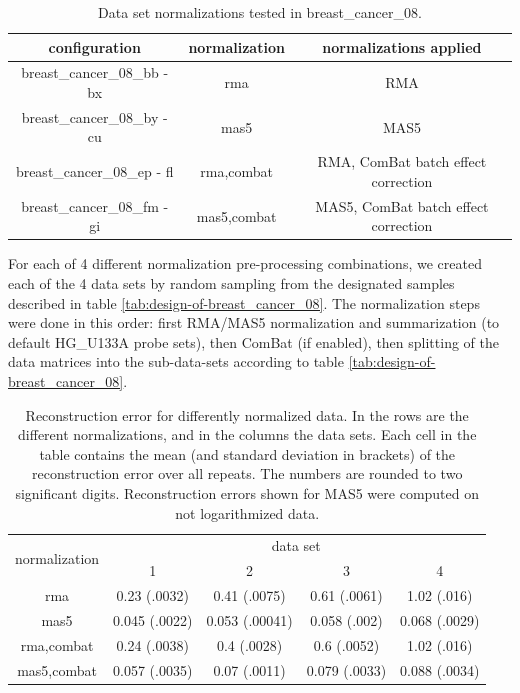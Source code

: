 \begin{table}
\begin{centering}
\begin{tabular}{|c|c|c|}
\hline 
configuration & normalization & normalizations applied\tabularnewline
\hline 
\hline 
breast\_cancer\_08\_bb - bx & rma & RMA\tabularnewline
\hline 
breast\_cancer\_08\_by - cu & mas5 & MAS5\tabularnewline
\hline 
breast\_cancer\_08\_ep - fl & rma,combat & RMA, ComBat batch effect correction\tabularnewline
\hline 
breast\_cancer\_08\_fm - gi & mas5,combat & MAS5, ComBat batch effect correction\tabularnewline
\hline 
\end{tabular}
\par\end{centering}
\caption{\label{tab:normalizations-for-breast_cancer_08}Data set normalizations
tested in breast\_cancer\_08.}
\end{table}

For each of 4 different normalization pre-processing combinations,
we created each of the 4 data sets by random sampling from the designated
samples described in table \ref{tab:design-of-breast_cancer_08}.
The normalization steps were done in this order: first RMA/MAS5 normalization
and summarization (to default HG\_U133A probe sets), then ComBat (if
enabled), then splitting of the data matrices into the sub-data-sets
according to table \ref{tab:design-of-breast_cancer_08}.

\begin{table}
\begin{centering}
\begin{tabular}{|c||c|c|c|c|}
\hline 
\multirow{2}{*}{normalization} & \multicolumn{4}{c|}{data set}\tabularnewline
\cline{2-5} 
 & 1 & 2 & 3 & 4\tabularnewline
\hline 
\hline 
rma & 0.23 (.0032) & 0.41 (.0075) & 0.61 (.0061) & 1.02 (.016)\tabularnewline
\hline 
mas5 & 0.045 (.0022) & 0.053 (.00041) & 0.058 (.002) & 0.068 (.0029)\tabularnewline
\hline 
rma,combat & 0.24 (.0038) & 0.4 (.0028) & 0.6 (.0052) & 1.02 (.016)\tabularnewline
\hline 
mas5,combat & 0.057 (.0035) & 0.07 (.0011) & 0.079 (.0033) & 0.088 (.0034)\tabularnewline
\hline 
\end{tabular}
\par\end{centering}
\caption[Reconstruction error for differently normalized data.]{\label{tab:Reconstruction-error-for-breast_cancer_08}Reconstruction
error for differently normalized data. In the rows are the different
normalizations, and in the columns the data sets. Each cell in the
table contains the mean (and standard deviation in brackets) of the
reconstruction error over all repeats. The numbers are rounded to
two significant digits. Reconstruction errors shown for MAS5 were
computed on not logarithmized data.}
\end{table}

